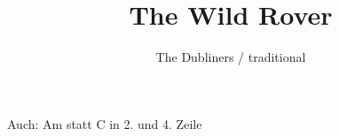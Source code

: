 \documentclass[9pt,a4paper,oneside, onecolumn]{article}
\author{The Dubliners / traditional}
\title{The Wild Rover}
\date{}
\begin{document}
\maketitle
\thispagestyle{empty}

Auch: Am statt C in 2. und 4. Zeile\\

\mbox{
}


\newcommand{\Am}{\upchord{Am}}
\newcommand{\A}{\upchord{A}}
\newcommand{\Dm}{\upchord{Dm}}
\newcommand{\Ds}{\upchord{D7}}
\newcommand{\F}{\upchord{F}}
\newcommand{\Fism}{\upchord{F$\sharp$m}}
\newcommand{\Hm}{\upchord{Hm}}
\newcommand{\Hbs}{\upchord{H$\flat$7}}
\newcommand{\C}{\upchord{C}}
\newcommand{\Em}{\upchord{Em}}
\newcommand{\Gs}{\upchord{G7}}
\newcommand{\G}{\upchord{G}}
\newcommand{\D}{\upchord{D}}
\newcommand{\x}[1]{\upchord{#1}}
\end{document}
